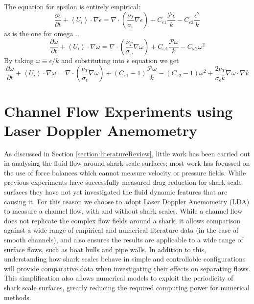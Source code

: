 \documentclass[12pt,oneside,a4paper]{article}
\newcommand{\pdev}[2]{\frac{\partial {#1}}{\partial {#2}}}
\begin{document}
The equation for epsilon is entirely empirical:
\begin{equation}
\pdev{\epsilon}{t}  + \left< U_i \right> \cdot \nabla \epsilon = \nabla \cdot \left( \frac{\nu_T}{\sigma_{\epsilon}} \nabla \epsilon \right) + C_{\epsilon 1} \frac{\mathcal{P} \epsilon}{k} - C_{\epsilon 2} \frac{\epsilon^2}{k}
\end{equation}
as is the one for omega .. 
\begin{equation}
\pdev{\omega}{t}  + \left< U_i \right> \cdot \nabla \omega = \nabla \cdot \left( \frac{\nu_T}{\sigma_{\omega}} \nabla \omega \right) + C_{\omega 1} \frac{\mathcal{P} \omega}{k} - C_{\omega 2} \omega^2
\end{equation}
By taking $\omega \equiv \epsilon /k$ and substituting into $\epsilon$ equation we get
\begin{equation}
\pdev{\omega}{t}  + \left< U_i \right> \cdot \nabla \omega = \nabla \cdot \left( \frac{\nu_T}{\sigma_{\epsilon}} \nabla \omega \right) + (C_{\varepsilon 1}-1) \frac{\mathcal{P} \omega}{k} - (C_{\varepsilon 2}-1) \omega^2 + \frac{2 \nu_T}{\sigma_\epsilon k}\nabla \omega \cdot \nabla k
\end{equation}

\newpage

\section{Channel Flow Experiments using Laser Doppler Anemometry}
As discussed in Section \ref{section:literatureReview}, little work has been carried out in analysing the fluid flow around shark scale surfaces; most work has focussed on the use of force balances which cannot measure velocity or pressure fields. While previous experiments have successfully measured drag reduction for shark scale surfaces they have not yet investigated the fluid dynamic features that are causing it. For this reason we choose to adopt Laser Doppler Anemometry (LDA) to measure a channel flow, with and without shark scales. While a channel flow does not replicate the complex flow fields around a shark, it allows comparison against a wide range of empirical and numerical literature data (in the case of smooth channels), and also ensures the results are applicable to a wide range of surface flows, such as boat hulls and pipe walls. In addition to this, understanding how shark scales behave in simple and controllable configurations will provide comparative data when investigating their effects on separating flows. This simplification also allows numerical models to exploit the periodicity of shark scale surfaces, greatly reducing the required computing power for numerical methods. 
\end{document}
